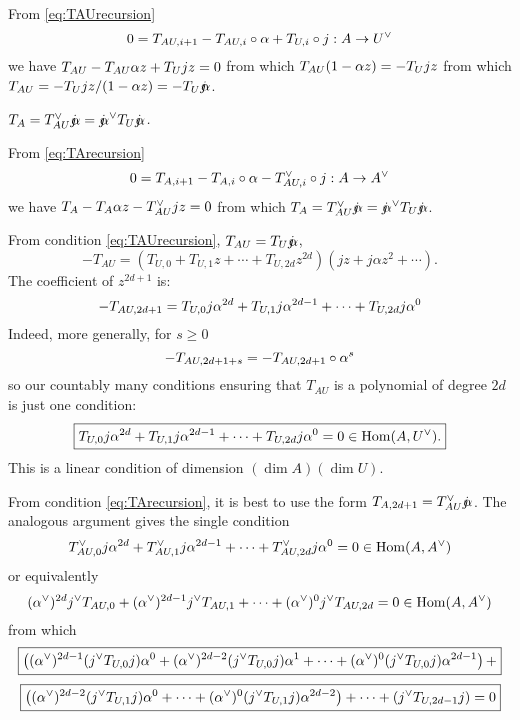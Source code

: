 {\bpf From \eqref{eq:TAUrecursion}
$$
0 = T_{AU, i+1}   - T_{AU,i} \circ \alpha + T_{U,i} \circ j: A \rightarrow U^\vee$$
we have
$T_{AU} - T_{AU} \alpha z + T_U jz = 0$ from which $T_{AU} (1-\alpha z) = - T_U jz$ from which
$T_{AU} = -T_U jz / (1-\alpha z) = - T_U \mathord{j\mkern-7mu\alpha}$. \epf

 {\em $T_A = T_{AU}^\vee \mathord{j\mkern-7mu\alpha} = \mathord{j\mkern-7mu\alpha}^\vee T_U \mathord{j\mkern-7mu\alpha}$.}

\bpf From \eqref{eq:TArecursion}
$$
0 = T_{A, i+1} - T_{A,i} \circ \alpha - T_{AU,i}^\vee \circ j : A \rightarrow A^\vee$$
we have
$T_A - T_A \alpha z - T_{AU}^\vee j z = 0$ from which $T_A = T_{AU}^\vee \mathord{j\mkern-7mu\alpha} = \mathord{j\mkern-7mu\alpha}^\vee T_U \mathord{j\mkern-7mu\alpha}$. \epf


From condition \eqref{eq:TAUrecursion}, $T_{AU} = T_U \mathord{j\mkern-7mu\alpha}$,
$$
-T_{AU} = \left( T_{U,0} + T_{U,1} z + \cdots + T_{U,2d} z^{2d} \right) \left( jz + j \alpha z ^2 + \cdots \right).$$
The coefficient of $z^{2d+1}$ is:
$$
-T_{AU,2d+1}=T_{U,0} j \alpha^{2d} + T_{U,1} j \alpha^{2d-1} + \cdots + T_{U,2d} j \alpha^0
$$
Indeed, more generally, for $s \geq 0$
$$
-T_{AU,2d+1+s}=-T_{AU,2d+1} \circ \alpha^s
$$
so our countably many conditions ensuring that $T_{AU}$ is a polynomial of degree $2d$ is just one condition:
\begin{equation}\label{eq:first}
\boxed{T_{U,0} j \alpha^{2d} + T_{U,1} j \alpha^{2d-1} + \cdots + T_{U,2d} j \alpha^0 = 0 \in \operatorname{Hom}(A, U^\vee).}
\end{equation}
This is a linear condition of dimension $(\dim A)(\dim U)$.




From condition \eqref{eq:TArecursion}, it is best to use the form $T_{A,2d+1} = T_{AU}^\vee \mathord{j\mkern-7mu\alpha}$.
The analogous argument gives the single condition
$$
T^\vee_{AU,0} j \alpha^{2d} + T^\vee_{AU,1} j \alpha^{2d-1} + \cdots + T^\vee_{AU,2d} j \alpha^0 = 0 \in \operatorname{Hom}(A, A^\vee)
$$
or equivalently 
$$
(\alpha^\vee)^{2d} j^\vee T_{AU,0}  + (\alpha^\vee)^{2d-1} j^\vee T_{AU,1} + \cdots + (\alpha^\vee)^0 j^\vee T_{AU,2d} = 0 \in \operatorname{Hom}(A, A^\vee)
$$
from which
\begin{equation}\label{eq:second}\boxed{
\left(   (\alpha^\vee)^{2d-1}  ( j^\vee T_{U,0} j)   \alpha^0 + 
  (\alpha^\vee)^{2d-2}  ( j^\vee T_{U,0} j)   \alpha^1 +  \cdots  +
  (\alpha^\vee)^{0}  ( j^\vee T_{U,0} j)   \alpha^{2d-1} \right) +  }\end{equation}
$$
\boxed{\left(   (\alpha^\vee)^{2d-2}  ( j^\vee T_{U,1} j)   \alpha^0 +   \cdots  +
    (\alpha^\vee)^{0}  ( j^\vee T_{U,1} j)   \alpha^{2d-2} \right) + \cdots + 
\left( j^\vee T_{U,2d-1} j \right) = 0}$$


}
